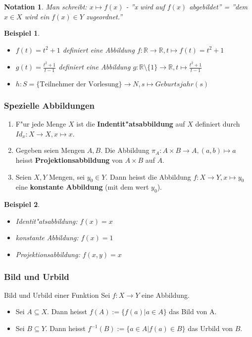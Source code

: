 \documentclass[11pt]{article}
\newtheorem{exa}{Beispiel}[section]
\newtheorem*{notation}{Notation}
\begin{document}
\begin{notation}
Man schreibt: \(x\mapsto f(x)\) - ''x wird auf \(f(x)\) abgebildet'' = ''dem \(x\in
X\) wird ein \(f(x)\in Y\) zugeordnet.''
\end{notation}

\begin{exa}\
\begin{itemize}
\item \(f(t)=t^2+1\) definiert eine Abbildung \(f: \mathbb{R}\to \mathbb{R}, t\mapsto f(t)=t^2+1\)
\item \(g(t)= \frac{t^2+1}{t-1}\) definiert eine Abbildung \(g: \mathbb{R}\setminus\{
   1\}\to \mathbb{R}, t\mapsto  \frac{t^2+1}{t-1}\)
\item \(h: S=\{\text{Teilnehmer der Vorlesung}\}\to N, s\mapsto Geburtsjahr(s)\)
\end{itemize}
\end{exa}

\subsubsection{Spezielle Abbildungen}
\label{sec:orge512a75}
\begin{relation}
\begin{enumerate}
\item F"ur jede Menge \(X\) ist die \textbf{Indentit"atsabbildung} auf \(X\) definiert durch \(Id_x:X\to X, x\mapsto x\).
\item Gegeben seien Mengen \(A,B\). Die Abbildung \(\pi_A: A\times B \to A, (a,b)
    \mapsto a\) heisst \textbf{Projektionsabbildung} von \(A\times B\) auf \(A\).
\item Seien \(X,Y\) Mengen, sei \(y_0 \in Y\). Dann heisst die Abbildung \(f: X\to
    Y, x\mapsto y_0\) eine \textbf{konstante Abbildung} (mit dem wert \(y_0\)).
\end{enumerate}
\end{relation}

\begin{exa}\
\begin{itemize}
\item Identit"atsabbildung: \(f(x)=x\)
\item konstante Abbildung: \(f(x)=1\)
\item Projektionsabbildung: \(f(x,y)=x\)
\end{itemize}
\end{exa}

\subsubsection{Bild und Urbild}
\label{sec:org006b051}
\begin{definition}{Bild und Urbild einer Funktion}{}
Sei \(f: X\to Y\) eine Abbildung.
\begin{itemize}
\item Sei \(A\subseteq X\). Dann heisst \(f(A):=\{f(a)|a\in A\}\) das Bild von A.
\item Sei \(B\subseteq Y\). Dann heisst \(f^{-1}(B):=\{a\in A|f(a)\in B\}\) das Urbild von \(B\).
\end{itemize}
\end{definition}
\end{document}

